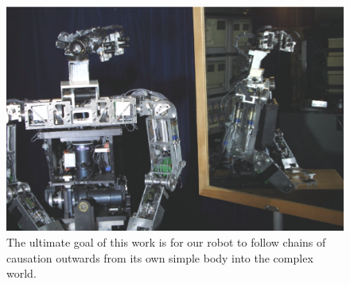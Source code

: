 \ifverbose
\begin{figure}[tbh]
\begin{center}
\includegraphics[width=\columnwidth]{mirror-cog.eps}
\caption{ 
\label{fig:mirror-cog}
%
The ultimate goal of this work is for our robot to follow chains of
causation outwards from its own simple body into the complex world.
%
}
\end{center}
\end{figure}
\fi
